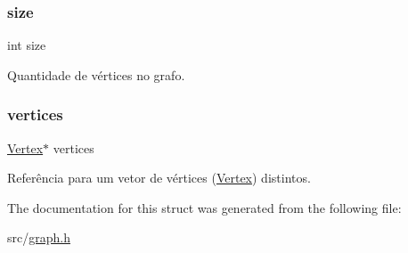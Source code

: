 \subsubsection{\texorpdfstring{size}{size}}
{\footnotesize\ttfamily int size}

Quantidade de vértices no grafo. \mbox{\label{struct_graph_aa184fcb106f77d0014446ed6844db369}} 
\subsubsection{\texorpdfstring{vertices}{vertices}}
{\footnotesize\ttfamily \mbox{\hyperlink{struct_vertex}{Vertex}}$\ast$ vertices}

Referência para um vetor de vértices (\mbox{\hyperlink{struct_vertex}{Vertex}}) distintos. 

The documentation for this struct was generated from the following file\+:\begin{DoxyCompactItemize}
\item 
src/\mbox{\hyperlink{graph_8h}{graph.\+h}}\end{DoxyCompactItemize}
